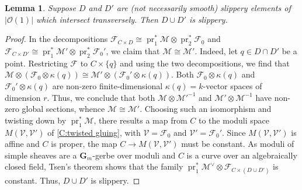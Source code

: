 \documentclass[11pt]{amsart}
\newcommand{\field}[1]{\mathbf #1}
\newcommand{\ms}[1]{\mathscr #1}
\DeclareMathOperator{\pr}{pr}
\newcommand{\G}{\field G} %
\renewcommand{\[}{[\!\hspace{0.03em}[}
\renewcommand{\]}{]\!\hspace{0.03em}]}
\renewcommand{\(}{(\!\hspace{0.03em}(}
\renewcommand{\)}{)\!\hspace{0.03em})}
\DeclareMathOperator*{\tensor}{\otimes}
\newtheorem{lem}{Lemma}[subsubsection]%
\theoremstyle{definition}
\theoremstyle{remark}
\begin{document}
\begin{lem}\label{L:add a yummy} Suppose $D$ and $D'$ are (not necessarily smooth) slippery elements of 
$|{\ms O}(1)|$ which intersect transversely.  
Then $D\cup D'$ is slippery.
\end{lem}
\begin{proof}
In the decompositions $\ms F_{C\times D}\cong\pr_{1}^{\ast}\ms 
M\tensor\pr_{2}^{\ast}\ms F_{0}$ and $\ms F_{C\times D'}\cong\pr_{1}^{\ast}\ms 
M'\tensor\pr_{2}^{\ast}\ms F_{0}'$, we claim that $\ms M\cong\ms 
M'$.  Indeed, let $q\in D\cap D'$ be a point.  Restricting $\ms F$ 
to $C\times \{q\}$ and using the two decompositions, we find that 
$\ms M\tensor(\ms F_{0}\tensor\kappa(q))\cong\ms M'\tensor(\ms 
F_{0}'\tensor\kappa(q))$.  Both $\ms F_{0}\tensor\kappa(q)$ and $\ms 
F_{0}'\tensor\kappa(q)$ are non-zero finite-dimensional $\kappa(q)=k$-vector 
spaces of dimension $r$.  Thus, we conclude that both $\ms M\tensor\ms M'^{-1}$ and 
$\ms M'\tensor\ms M^{-1}$ have non-zero global sections, whence $\ms 
M\cong\ms M'$.  Choosing such an isomorphism and twisting down by 
$\pr_{1}^{\ast}\ms M$, there results a map from $C$ to the moduli 
space $M(\ms V,\ms V')$ of \ref{C:twisted gluing}, with $\ms V=\ms 
F_{0}$ and $\ms V'=\ms F_{0}'$.  Since $M(\ms V,\ms 
V')$ is affine and $C$ is proper, the map $C\to M(\ms V,\ms V')$ must 
be constant.  As moduli of simple sheaves are a $\G_{m}$-gerbe over moduli and $C$ is a 
curve over an algebraically closed field, Tsen's theorem shows that 
the family $\pr_{1}^{\ast}\ms M^{\vee}\tensor\ms F_{C\times (D\cup 
D')}$ is constant.  Thus, $D\cup D'$ is slippery.
\end{proof}
\end{document}
